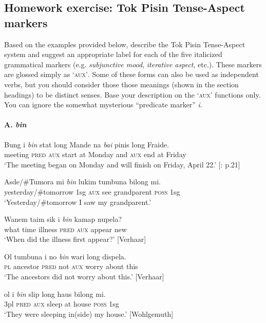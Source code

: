 \subsection*{Homework exercise: Tok Pisin Tense-Aspect markers} %

Based on the examples provided below, describe the Tok Pisin Tense-Aspect system and suggest an appropriate label for each of the five italicized grammatical markers (e.g. \textit{subjunctive mood}, \textit{iterative aspect}, etc.). These markers are glossed simply as ‘\textsc{aux’}. Some of these forms can also be used as independent verbs, but you should consider those those meanings (shown in the section headings) to be distinct senses. Base your description on the ‘\textsc{aux’} functions only. You can ignore the somewhat mysterious “predicate marker” \textit{i}.


\paragraph{A. \textit{bin}}
\ea
\gll   Bung  i  \textit{bin}  stat  long  Mande  na  \textit{bai}  pinis  long  Fraide.\\
meeting  \textsc{pred}  \textsc{aux}  start  at  Monday  and  \textsc{aux}  end  at  Friday\\
\glt ‘The meeting began on Monday and will finish on Friday, April 22.’ [\citealt{Sebba1997}: p.21] 
\z

\ea
\gll  Asde/\#Tumora  mi  \textit{bin}  lukim  tumbuna  bilong  mi.\\
yesterday/\#tomorrow  1sg  \textsc{aux}  see  grandparent  \textsc{poss}  1sg\\
\glt ‘Yesterday/\#tomorrow I saw my grandparent.’
\z

\ea
\gll  Wanem  taim  sik  i  \textit{bin}  kamap  nupela?\\
what  time  illness  \textsc{pred}  \textsc{aux}  appear  new\\
\glt ‘When did the illness first appear?’  [Verhaar]
\z

\ea
\gll   Ol  tumbuna  i  no  \textit{bin}  wari  long  dispela.\\
\textsc{pl}  ancestor  \textsc{pred}  not  \textsc{aux}  worry  about  this\\
\glt ‘The ancestors did not worry about this.’  [Verhaar]
\z

\ea
\gll  ol  i  \textit{bin}  slip  long  haus  bilong  mi.\\
3pl  \textsc{pred}  \textsc{aux}  sleep  at  house  \textsc{poss}  1sg\\
\glt ‘They were sleeping in(side) my house.’  [Wohlgemuth]
\z

